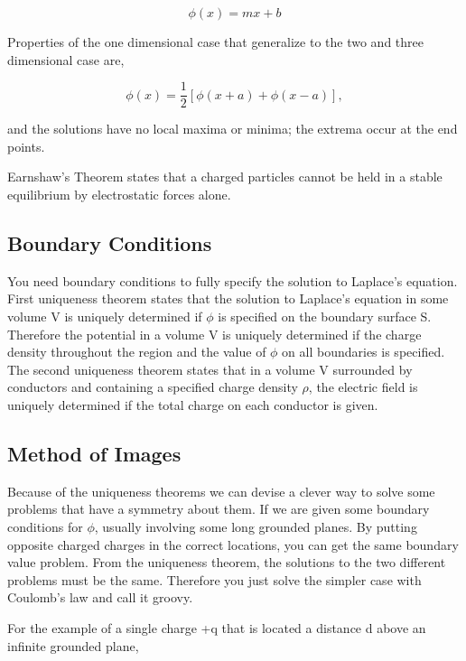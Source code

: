 \documentclass[preprint, review,12pt]{elsarticle}
\begin{document}
\begin{equation}
    \phi(x) = mx + b
\end{equation}

Properties of the one dimensional case that generalize to the two and three dimensional case are,

\begin{equation}
    \phi(x) = \frac{1}{2}[\phi(x+a) + \phi(x-a)],
\end{equation}

and the solutions have no local maxima or minima; the extrema occur at the end points. 

Earnshaw's Theorem states that a charged particles cannot be held in a stable equilibrium by electrostatic forces alone.

\subsection{Boundary Conditions}

You need boundary conditions to fully specify the solution to Laplace's equation. First uniqueness theorem states that the solution to Laplace's equation in some volume V is uniquely determined if $\phi$ is specified on the boundary surface S. Therefore the potential in a volume V is uniquely determined if the charge density throughout the region and the value of $\phi$ on all boundaries is specified. The second uniqueness theorem states that in a volume V surrounded by conductors and containing a specified charge density $\rho$, the electric field is uniquely determined if the total charge on each conductor is given.

\subsection{Method of Images}

Because of the uniqueness theorems we can devise a clever way to solve some problems that have a symmetry about them. If we are given some boundary conditions for $\phi$, usually involving some long grounded planes. By putting opposite charged charges in the correct locations, you can get the same boundary value problem. From the uniqueness theorem, the solutions to the two different problems must be the same. Therefore you just solve the simpler case with Coulomb's law and call it groovy.

For the example of a single charge +q that is located a distance d above an infinite grounded plane, 
\end{document}
